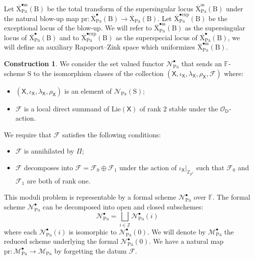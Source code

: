 \documentclass[10pt]{amsart}
\numberwithin{equation}{section}
\theoremstyle{definition}
\newtheorem{construction}[equation]{Construction}
\def\Pa{\mathrm{Pa}}
\def\calF{\mathcal{F}}
\def\calN{\mathcal{N}}
\def\calM{\mathcal{M}}
\def\calO{\mathcal{O}}
\def\FF{\mathbb{F}}
\def\sfX{\mathsf{X}}
\def\ZZ{\mathbb{Z}}
\def\rmB{\mathrm{B}}
\def\rmD{\mathrm{D}}
\def\rmS{\mathrm{S}}
\def\rmX{\mathrm{X}}
\begin{document}
Let $\overline{\rmX}^{\bullet\mathrm{ss}}_{\Pa}(\rmB)$ be the total transform of the supersingular locus $\overline{\rmX}^{\mathrm{ss}}_{\Pa}(\rmB)$ under the natural blow-up map $\mathrm{pr}: \overline{\rmX}^{\bullet}_{\Pa}(\rmB)\rightarrow \overline{\rmX}_{\Pa}(\rmB)$. Let $\overline{\rmX}^{\bullet\mathrm{exp}}_{\Pa}(\rmB)$ be the exceptional locus of the blow-up. We will refer to $\overline{\rmX}^{\bullet\mathrm{ss}}_{\Pa}(\rmB)$ as the supersingular locus of $\overline{\rmX}^{\bullet}_{\Pa}(\rmB)$ and to $\overline{\rmX}^{\bullet\mathrm{exp}}_{\Pa}(\rmB)$ as the superspecial locus of $\overline{\rmX}^{\bullet}_{\Pa}(\rmB)$, we will define an auxiliary Rapoport--Zink space which uniformizes $\overline{\rmX}^{\bullet\mathrm{ss}}_{\Pa}(\rmB)$.
\begin{construction}
We consider the set valued functor $\mathcal{N}^{\bullet}_{\mathrm{Pa}}$ that sends an $\FF$-scheme $\rmS$ to the isomorphism classes of the collection $(\sfX, \iota_{\sfX},  \lambda_{\sfX}, \rho_{\sfX}, \calF)$ where:
\begin{itemize} 
\item $(\mathsf{X}, \iota_{\sfX},  \lambda_{\sfX}, \rho_{\sfX})$ is an element of $\mathcal{N}_{\mathrm{Pa}}(\rmS)$;
\item $\calF$ is a local direct summand of $\mathrm{Lie}(\mathsf{X})$ of rank $2$ stable under the $\calO_{\rmD}$-action.
\end{itemize}

We require that $\calF$ satisfies the following conditions: 
\begin{itemize}
\item $\calF$ is annihilated by $\Pi$;
\item $\calF$ decomposes into $\calF=\calF_{0}\oplus \calF_{1}$ under the action of $\iota_{\sfX}\vert_{\ZZ_{p^{2}}}$ such that $\calF_{0}$ and $\calF_{1}$ are both of rank one.
\end{itemize}
\end{construction}

This moduli problem is representable by a formal scheme $\calN^{\bullet}_{\Pa}$ over $\FF$. The formal scheme $\calN^{\bullet}_{\Pa}$ can be decomposed into open and closed subschemes: 
\begin{equation*}
\calN^{\bullet}_{\Pa}=\bigsqcup\limits_{i\in\ZZ}\calN^{\bullet}_{\Pa}(i) 
\end{equation*}
where each $\calN^{\bullet}_{\Pa}(i)$ is isomorphic to $\calN^{\bullet}_{\Pa}(0)$. We will denote  by $\calM^{\bullet}_{\Pa}$ the reduced scheme underlying the formal $\calN^{\bullet}_{\Pa}(0)$. We have a natural map $\mathrm{pr}:\calM^{\bullet}_{\Pa}\rightarrow\calM_{\Pa}$ by forgetting the datum $\calF$.  
\end{document}
